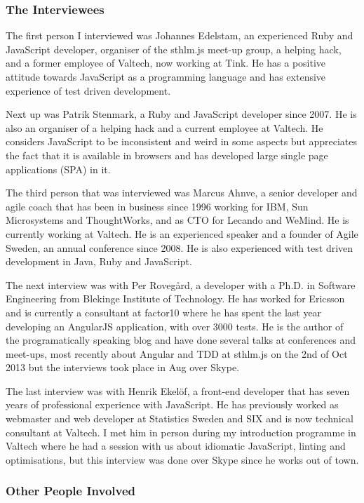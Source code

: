 \documentclass[11pt]{article}
\begin{document}
\subsubsection{The Interviewees}

The first person I interviewed was Johannes Edelstam, an experienced Ruby and JavaScript developer, organiser of the sthlm.js meet-up group, a helping hack, and a former employee of Valtech, now working at Tink. He has a positive attitude towards JavaScript as a programming language and has extensive experience of test driven development.

Next up was Patrik Stenmark, a Ruby and JavaScript developer since 2007. He is also an organiser of a helping hack and a current employee at Valtech. He considers JavaScript to be inconsistent and weird in some aspects but appreciates the fact that it is available in browsers and has developed large single page applications (SPA) in it.

The third person that was interviewed was Marcus Ahnve, a senior developer and agile coach that has been in business since 1996 working for IBM, Sun Microsystems and ThoughtWorks, and as CTO for Lecando and WeMind. He is currently working at Valtech. He is an experienced speaker and a founder of Agile Sweden, an annual conference since 2008. He is also experienced with test driven development in Java, Ruby and JavaScript.

The next interview was with Per Rovegård, a developer with a Ph.D. in Software Engineering from Blekinge Institute of Technology. He has worked for Ericsson and is currently a consultant at factor10 where he has spent the last year developing an AngularJS application, with over 3000 tests. He is the author of the programatically speaking blog and have done several talks at conferences and meet-ups, most recently about Angular and TDD at sthlm.js on the 2nd of Oct 2013 but the interviews took place in Aug over Skype.

The last interview was with Henrik Ekelöf, a front-end developer that has seven years of professional experience with JavaScript. He has previously worked as webmaster and web developer at Statistics Sweden and SIX and is now technical consultant at Valtech. I met him in person during my introduction programme in Valtech where he had a session with us about idiomatic JavaScript, linting and optimisations, but this interview was done over Skype since he works out of town.

\subsubsection{Other People Involved}
\end{document}
